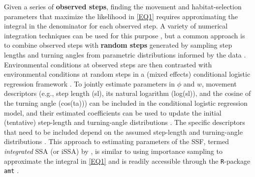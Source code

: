 \documentclass[abstract=on,10pt,a4paper,bibliography=totocnumbered]{article}
\begin{document}
Given a series of \textbf{observed steps}, finding the movement and
habitat-selection parameters that maximize the likelihood in \ref{EQ1} requires
approximating the integral in the denominator for each observed step. A variety
of numerical integration techniques can be used for this purpose
\citep{Michelot.2024}, but a common approach is to combine observed steps with
\textbf{random steps} generated by sampling step lengths and turning angles from
parametric distributions informed by the data \citep{Fortin.2005,
Thurfjell.2014}. Environmental conditions at observed steps are then contrasted
with environmental conditions at random steps in a (mixed effects) conditional
logistic regression framework \citep{Fortin.2005, Muff.2020}. To jointly
estimate parameters in $\phi$ and $w$, movement descriptors (e.g., step length
(sl), its natural logarithm (log(sl)), and the cosine of the turning angle
(cos(ta))) can be included in the conditional logistic regression model, and
their estimated coefficients can be used to update the initial (tentative)
step-length and turning-angle distributions \citep{Duchesne.2015, Avgar.2016,
Fieberg.2021}. The specific descriptors that need to be included depend on the
assumed step-length and turning-angle distributions \citep[for more details, see
Appendix C of][]{Fieberg.2021}. This approach to estimating parameters of the
SSF, termed \textit{integrated} SSA (or iSSA) by \citet{Avgar.2016}, is similar
to using importance sampling to approximate the integral in \ref{EQ1}
\citep{Michelot.2024} and is readily accessible through the \texttt{R}-package
\texttt{amt} \citep{Signer.2019}.

\end{document}
